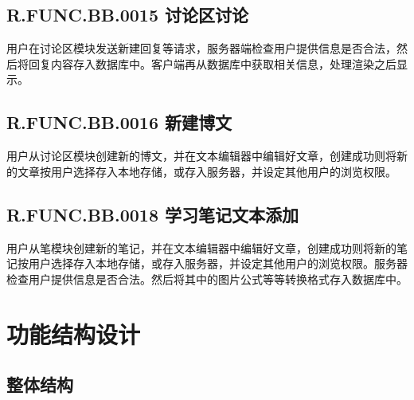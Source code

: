 \subsection{R.FUNC.BB.0015   讨论区讨论}
用户在讨论区模块发送新建回复等请求，服务器端检查用户提供信息是否合法，然后将回复内容存入数据库中。客户端再从数据库中获取相关信息，处理渲染之后显示。

\subsection{R.FUNC.BB.0016   新建博文}
用户从讨论区模块创建新的博文，并在文本编辑器中编辑好文章，创建成功则将新的文章按用户选择存入本地存储，或存入服务器，并设定其他用户的浏览权限。

\subsection{R.FUNC.BB.0018   学习笔记文本添加}
用户从笔模块创建新的笔记，并在文本编辑器中编辑好文章，创建成功则将新的笔记按用户选择存入本地存储，或存入服务器，并设定其他用户的浏览权限。服务器检查用户提供信息是否合法。然后将其中的图片公式等等转换格式存入数据库中。

\section{功能结构设计}
\subsection{整体结构}

